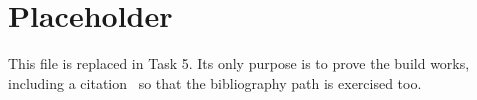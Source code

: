 \section*{Placeholder}
This file is replaced in Task 5. Its only purpose is to prove the build works,
including a citation~\citep{guo2022cmt} so that the bibliography path is
exercised too.

